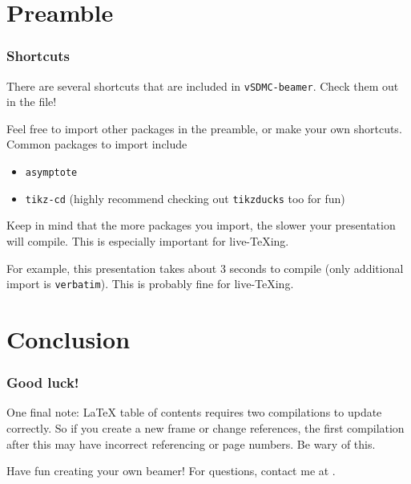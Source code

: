 \documentclass[mathserif]{beamer}
\begin{document}
\section{Preamble}

\begin{frame}\frametitle{Shortcuts}
	There are several shortcuts that are included in \texttt{vSDMC-beamer}. Check them out in the file!
	\pause
	
	Feel free to import other packages in the preamble, or make your own shortcuts. Common packages to import include
	\begin{itemize}
		\item \texttt{asymptote}
		\item \texttt{tikz-cd} (highly recommend checking out \texttt{tikzducks} too for fun)
	\end{itemize}
	\pause
	Keep in mind that the more packages you import, the slower your presentation will compile. This is especially important for live-TeXing.
	\pause
	
	For example, this presentation takes about 3 seconds to compile (only additional import is \texttt{verbatim}). This is probably fine for live-TeXing.
\end{frame}

\section{Conclusion}

\begin{frame}\frametitle{Good luck!}
	One final note: LaTeX table of contents requires two compilations to update correctly. So if you create a new frame or change references, the first compilation after this may have incorrect referencing or page numbers. Be wary of this.
	\pause
	
	Have fun creating your own beamer! For questions, contact me at .
\end{frame}
\end{document}
